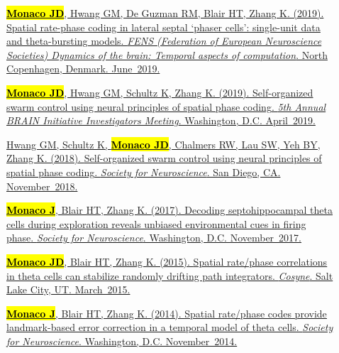 \documentclass[10pt]{article}
\newcommand{\itemtitle}[1]{{\color{hopkinsblue}\ul{#1}}}
\newcommand{\joehl}[1]{\hl{\textbf{#1}}}
\begin{document}
\begin{description}
  \item[\quad]
    \href{https://www.fens.org/Meetings/The-Brain-Conferences/Dynamics-of-the-brain/}
    {\joehl{Monaco JD}, Hwang GM, De Guzman RM, Blair HT, Zhang K. (2019).
    \itemtitle{Spatial rate-phase coding in lateral septal ‘phaser cells’:
        single-unit data and theta-bursting models}. \emph{FENS (Federation of
        European Neuroscience Societies) Dynamics of the brain: Temporal aspects of
    computation}. North Copenhagen, Denmark. June~2019.}
  \item[\quad]
    \href{http://www.cvent.com/events/5th-annual-brain-initiative-investigators-meeting/event-summary-de9c0d8f934b46eb8d80b55bcfbfe96a.aspx}
    {\joehl{Monaco JD}, Hwang GM, Schultz K, Zhang K. (2019).
    \itemtitle{Self-organized swarm control using neural principles of spatial
      phase coding}. \emph{5th Annual BRAIN Initiative Investigators Meeting}.
    Washington, D.C. April~2019.} 
  \item[\quad]
    \href{https://abstractsonline.com/pp8/#!/4649/presentation/10884}
    {Hwang GM, Schultz K, \joehl{Monaco JD}, Chalmers RW, Lau SW, Yeh BY,
      Zhang K. (2018). \itemtitle{Self-organized swarm control using neural
      principles of spatial phase coding}. \emph{Society for Neuroscience}.
    San Diego, CA. November~2018.}
  \item[\quad]
    \href{http://www.abstractsonline.com/pp8/#!/4376/presentation/6085}
    {\joehl{Monaco J}, Blair HT, Zhang K. (2017). \itemtitle{Decoding
        septohippocampal theta cells during exploration reveals unbiased
      environmental cues in firing phase}. \emph{Society for Neuroscience}.
    Washington, D.C. November~2017.}
  \item[\quad]
    \href{http://jdmonaco.com/files/monaco-paper-cosyne15.pdf}
    {\joehl{Monaco JD}, Blair HT, Zhang K. (2015). \itemtitle{Spatial
        rate/phase correlations in theta cells can stabilize randomly drifting path
    integrators}. \emph{Cosyne}. Salt Lake City, UT. March~2015.}
  \item[\quad]
    \href{http://www.abstractsonline.com/Plan/ViewAbstract.aspx?sKey=973d2662-ba7a-4ad2-aff9-fe0d4b77c262&cKey=9917ffaf-9e31-4213-acb9-4aab498ab4cd&mKey=54c85d94-6d69-4b09-afaa-502c0e680ca7}
    {\joehl{Monaco J}, Blair HT, Zhang K. (2014). \itemtitle{Spatial rate/phase
        codes provide landmark-based error correction in a temporal model of theta
    cells}. \emph{Society for Neuroscience}. Washington, D.C.  November~2014.}

\end{description}
\end{document}
